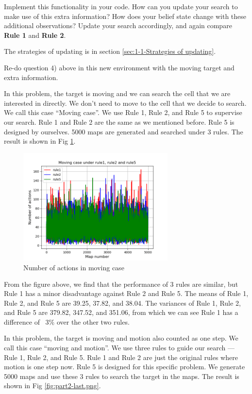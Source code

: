 \documentclass[letter]{article}
\begin{document}
\par{Implement this functionality in your code. How can you update your search to make use of this extra information?
	How does your belief state change with these additional observations? Update your search accordingly, and again
	compare \textbf{Rule 1} and \textbf{Rule 2}.}

	The strategies of updating is in section \ref{sec:1-1-Strategies of updating}.

\par{Re-do question 4) above in this new environment with the moving target and extra information.}

	In this problem, the target is moving and we can search the cell that we are interested in directly. We don’t need to move to the cell that we decide to search. We call this case ``Moving case''. We use Rule 1, Rule 2, and Rule 5 to supervise our search. Rule 1 and Rule 2 are the same as we mentioned before. Rule 5 is designed by ourselves. 5000
	maps are generated and searched under 3 rules. The result is shown in Fig \ref{fig:part2-first}.
	
	\begin{figure}[H]
		\centering
		\includegraphics[width=0.7\textwidth]{fig/part2-first.png}
		\caption{Number of actions in moving case}
		\label{fig:part2-first}
	\end{figure}
	
	From the figure above, we find that the performance of 3 rules are similar, but Rule 1 has a minor disadvantage against Rule 2 and Rule 5. The means of Rule 1, Rule 2, and Rule 5 are 39.25, 37.82, and 38.04. The variances of Rule 1, Rule 2, and Rule 5 are 379.82, 347.52, and 351.06, from which we can see Rule 1 has a difference of ~3\% over the other two rules.
	

	In this problem, the target is moving and motion also counted as one step. We call this case ``moving and motion''. We use three rules to guide our search --- Rule 1, Rule 2, and Rule 5. Rule 1 and Rule 2 are just the original rules where motion is one step now. Rule 5 is designed for this specific problem. We generate 5000 maps and use these 3 rules to search the target in the maps. The result is shown in Fig \ref{fig:part2-last.png}.
	
\end{document}
